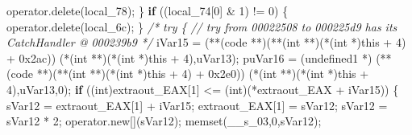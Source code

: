 \documentclass[
]{article}
\newenvironment{Shaded}{}{}
\newcommand{\BaseNTok}[1]{\textcolor[rgb]{0.25,0.63,0.44}{#1}}
\newcommand{\CommentTok}[1]{\textcolor[rgb]{0.38,0.63,0.69}{\textit{#1}}}
\newcommand{\ControlFlowTok}[1]{\textcolor[rgb]{0.00,0.44,0.13}{\textbf{#1}}}
\newcommand{\DataTypeTok}[1]{\textcolor[rgb]{0.56,0.13,0.00}{#1}}
\newcommand{\DecValTok}[1]{\textcolor[rgb]{0.25,0.63,0.44}{#1}}
\newcommand{\NormalTok}[1]{#1}
\newcommand{\OperatorTok}[1]{\textcolor[rgb]{0.40,0.40,0.40}{#1}}
\begin{document}
\begin{Shaded}
\begin{Highlighting}[]
\NormalTok{        operator}\OperatorTok{.}\NormalTok{delete}\OperatorTok{(}\NormalTok{local\_78}\OperatorTok{);}
      \OperatorTok{\}}
      \ControlFlowTok{if} \OperatorTok{((}\NormalTok{local\_74}\OperatorTok{[}\DecValTok{0}\OperatorTok{]} \OperatorTok{\&} \DecValTok{1}\OperatorTok{)} \OperatorTok{!=} \DecValTok{0}\OperatorTok{)} \OperatorTok{\{}
\NormalTok{        operator}\OperatorTok{.}\NormalTok{delete}\OperatorTok{(}\NormalTok{local\_6c}\OperatorTok{);}
      \OperatorTok{\}}
                    \CommentTok{/* try \{ // try from 00022508 to 000225d9 has its CatchHandler @ 000239b9 */}
\NormalTok{      iVar15 }\OperatorTok{=} \OperatorTok{(**(}\NormalTok{code }\OperatorTok{**)(**(}\DataTypeTok{int} \OperatorTok{**)(*(}\DataTypeTok{int} \OperatorTok{*)}\NormalTok{this }\OperatorTok{+} \DecValTok{4}\OperatorTok{)} \OperatorTok{+} \BaseNTok{0x2ac}\OperatorTok{))}
                         \OperatorTok{(*(}\DataTypeTok{int} \OperatorTok{**)(*(}\DataTypeTok{int} \OperatorTok{*)}\NormalTok{this }\OperatorTok{+} \DecValTok{4}\OperatorTok{),}\NormalTok{uVar13}\OperatorTok{);}
\NormalTok{      puVar16 }\OperatorTok{=} \OperatorTok{(}\NormalTok{undefined1 }\OperatorTok{*)}
                \OperatorTok{(**(}\NormalTok{code }\OperatorTok{**)(**(}\DataTypeTok{int} \OperatorTok{**)(*(}\DataTypeTok{int} \OperatorTok{*)}\NormalTok{this }\OperatorTok{+} \DecValTok{4}\OperatorTok{)} \OperatorTok{+} \BaseNTok{0x2e0}\OperatorTok{))}
                          \OperatorTok{(*(}\DataTypeTok{int} \OperatorTok{**)(*(}\DataTypeTok{int} \OperatorTok{*)}\NormalTok{this }\OperatorTok{+} \DecValTok{4}\OperatorTok{),}\NormalTok{uVar13}\OperatorTok{,}\DecValTok{0}\OperatorTok{);}
      \ControlFlowTok{if} \OperatorTok{((}\DataTypeTok{int}\OperatorTok{)}\NormalTok{extraout\_EAX}\OperatorTok{[}\DecValTok{1}\OperatorTok{]} \OperatorTok{\textless{}=} \OperatorTok{(}\DataTypeTok{int}\OperatorTok{)(*}\NormalTok{extraout\_EAX }\OperatorTok{+}\NormalTok{ iVar15}\OperatorTok{))} \OperatorTok{\{}
\NormalTok{        sVar12 }\OperatorTok{=}\NormalTok{ extraout\_EAX}\OperatorTok{[}\DecValTok{1}\OperatorTok{]} \OperatorTok{+}\NormalTok{ iVar15}\OperatorTok{;}
\NormalTok{        extraout\_EAX}\OperatorTok{[}\DecValTok{1}\OperatorTok{]} \OperatorTok{=}\NormalTok{ sVar12}\OperatorTok{;}
\NormalTok{        sVar12 }\OperatorTok{=}\NormalTok{ sVar12 }\OperatorTok{*} \DecValTok{2}\OperatorTok{;}
\NormalTok{        operator}\OperatorTok{.}\NormalTok{new}\OperatorTok{[](}\NormalTok{sVar12}\OperatorTok{);}
\NormalTok{        memset}\OperatorTok{(}\NormalTok{\_\_s\_03}\OperatorTok{,}\DecValTok{0}\OperatorTok{,}\NormalTok{sVar12}\OperatorTok{);}

\end{Highlighting}
\end{Shaded}
\end{document}
